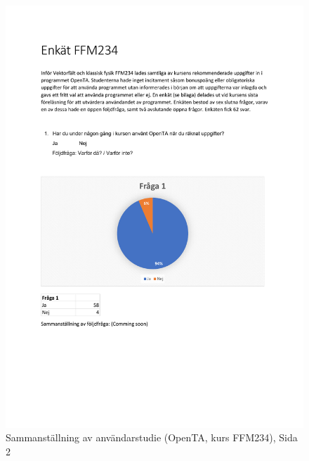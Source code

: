 \begin{figure}[hbtp]
    \centering
    \includegraphics[page=2,scale=0.85]{appendix/form_survey.pdf}
    \caption*{Sammanställning av användarstudie (OpenTA, kurs FFM234), Sida 2}
    \label{fig:openform2}
\end{figure}


